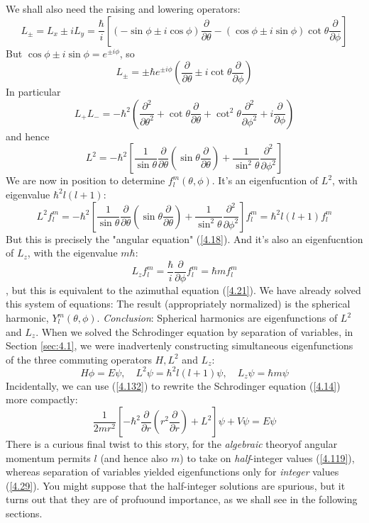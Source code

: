 We shall also need the raising and lowering operators: $$L_{\pm}=L_x\pm iL_y=\frac{\hbar}{i}\left[(-\sin\phi\pm i\cos\phi)\frac{\partial}{\partial\theta}-(\cos\phi\pm i\sin\phi)\cot\theta\frac{\partial}{\partial\phi}\right]$$ But $\cos\phi\pm i\sin\phi=e^{\pm i\phi}$, so
\begin{equation}\label{4.130}
	L_{\pm}=\pm \hbar e^{\pm i\phi}\left(\frac{\partial}{\partial\theta}\pm i\cot\theta\frac{\partial}{\partial\phi}\right)
\end{equation}
In particular
\begin{equation}\label{4.131}
	L_+L_-=-\hbar^2\left(\frac{\partial^2}{\partial\theta^2}+\cot\theta\frac{\partial}{\partial\theta}+\cot^2\theta\frac{\partial^2}{\partial\phi^2}+i\frac{\partial}{\partial\phi}\right)
\end{equation}
and hence
\begin{equation}\label{4.132}
	\boxed{L^2=-\hbar^2\left[\frac{1}{\sin\theta}\frac{\partial}{\partial\theta}\left(\sin\theta\frac{\partial}{\partial\theta}\right)+\frac{1}{\sin^2\theta}\frac{\partial^2}{\partial\phi^2}\right]}
\end{equation}
We are now in position to determine $f_l^m(\theta,\phi)$. It's an eigenfucntion of $L^2$, with eigenvalue $\hbar^2 l(l+1)$: $$L^2f_l^m=-\hbar^2\left[\frac{1}{\sin\theta}\frac{\partial}{\partial\theta}\left(\sin\theta\frac{\partial}{\partial\theta}\right)+\frac{1}{\sin^2\theta}\frac{\partial^2}{\partial\phi^2}\right]f_l^m=\hbar^2l(l+1)f_l^m$$ But this is precisely the "angular equation" (\ref{4.18}). And it's also an eigenfucntion of $L_z$, with the eigenvalue $m\hbar$: $$L_zf_l^m=\frac{\hbar}{i}\frac{\partial}{\partial\phi}f_l^m=\hbar mf_l^m$$, but this is equivalent to the azimuthal equation (\ref{4.21}). We have already solved this system of equations: The result (appropriately normalized) is the spherical harmonic, $Y_l^m(\theta,\phi)$. \textit{Conclusion}: Spherical harmonics are eigenfunctions of $L^2$ and $L_z$. When we solved the Schrodinger equation by separation of variables, in Section \ref{sec:4.1}, we were inadvertenly constructing simultaneous eigenfunctions of the three commuting operators $H, L^2$ and $L_z$:
\begin{equation}\label{4.133}
	H\phi=E\psi,\quad L^2\psi=\hbar^2l(l+1)\psi,\quad L_z\psi=\hbar m\psi
\end{equation}
Incidentally, we can use (\ref{4.132}) to rewrite the Schrodinger equation (\ref{4.14}) more compactly: $$\frac{1}{2mr^2}\left[-\hbar^2\frac{\partial}{\partial r}\left(r^2\frac{\partial}{\partial r}\right)+L^2\right]\psi + V\psi=E\psi$$ There is a curious final twist to this story, for the \textit{algebraic} theoryof angular momentum permits $l$ (and hence also $m$) to take on \textit{half}-integer values (\ref{4.119}), whereas separation of variables yielded eigenfunctions only for \textit{integer} values (\ref{4.29}). You might suppose that the half-integer solutions are spurious, but it turns out that they are of profuound importance, as we shall see in the following sections.

